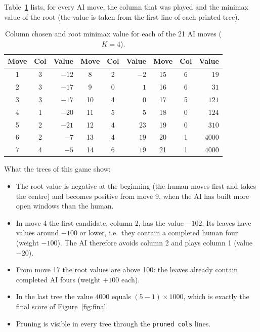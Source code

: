 \documentclass[11pt,a4paper]{article}
\begin{document}
Table~\ref{tab:game} lists, for every AI move, the column that was played and the minimax
value of the root (the value is taken from the first line of each printed tree).

\begin{table}[H]
\centering
\small
\begin{tabular}{@{}ccrccrccr@{}}
\toprule
Move & Col & Value & Move & Col & Value & Move & Col & Value\\
\midrule
1  & 3 & $-12$ & 8  & 2 & $-2$  & 15 & 6 & $19$\\
2  & 3 & $-17$ & 9  & 0 & $1$   & 16 & 6 & $31$\\
3  & 3 & $-17$ & 10 & 4 & $0$   & 17 & 5 & $121$\\
4  & 1 & $-20$ & 11 & 5 & $5$   & 18 & 0 & $124$\\
5  & 2 & $-21$ & 12 & 4 & $23$  & 19 & 0 & $310$\\
6  & 2 & $-7$  & 13 & 4 & $19$  & 20 & 1 & $4000$\\
7  & 4 & $-5$  & 14 & 6 & $19$  & 21 & 1 & $4000$\\
\bottomrule
\end{tabular}
\caption{Column chosen and root minimax value for each of the 21 AI moves ($K=4$).}
\label{tab:game}
\end{table}

What the trees of this game show:
\begin{itemize}
  \item The root value is negative at the beginning (the human moves first and takes the
  centre) and becomes positive from move 9, when the AI has built more open windows than
  the human.
  \item In move 4 the first candidate, column 2, has the value $-102$. Its leaves have
  values around $-100$ or lower, i.e.\ they contain a completed human four (weight
  $-100$). The AI therefore avoids column 2 and plays column 1 (value $-20$).
  \item From move 17 the root values are above 100: the leaves already contain completed
  AI fours (weight $+100$ each).
  \item In the last tree the value $4000$ equals $(5-1)\times 1000$, which is exactly the
  final score of Figure~\ref{fig:final}.
  \item Pruning is visible in every tree through the \texttt{pruned cols} lines.
\end{itemize}
\end{document}
